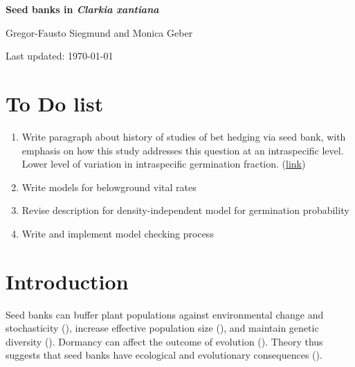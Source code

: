 \documentclass[12pt, oneside, titlepage]{article}   	%
\begin{document}
\begin{titlepage}
   \begin{center}
       \vspace*{1cm}
 
       \textbf{Seed banks in \textit{Clarkia xantiana}}
 
       \vspace{1.5cm}
 
       Gregor-Fausto Siegmund and Monica Geber
 
   	Last updated: \today
	
	\section*{To Do list}
	
	\begin{enumerate}
	
	\item Write paragraph about history of studies of bet hedging via seed bank, with emphasis on how this study addresses this question at an intraspecific level. Lower level of variation in intraspecific germination fraction. (\hyperlink{bet-hedging-history}{link})
	\item Write models for belowground vital rates
	\item Revise description for density-independent model for germination probability
	\item Write and implement model checking process
	
	\end{enumerate}
 
   \end{center}
\end{titlepage}
%

\section*{Introduction}

Seed banks can buffer plant populations against environmental change and stochasticity (\cite{eager2014,paniw2017}), increase effective population size (\cite{nunney2002,waples2006}), and maintain genetic diversity (\cite{mccue1998b}). Dormancy can affect the outcome of evolution (\cite{ritland1983,heinrich2018}). Theory thus suggests that seed banks have ecological and evolutionary consequences (\cite{evans2005}). 
\end{document}
